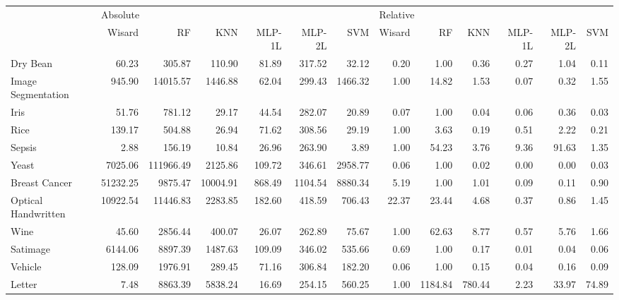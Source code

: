\begin{tabular}{lrrrrrrrrrrrr}
\toprule
{} & \multicolumn{6}{l}{Absolute} & \multicolumn{6}{l}{Relative} \\
{} &   Wisard &        RF &      KNN & MLP-1L &  MLP-2L &     SVM &   Wisard &      RF &    KNN & MLP-1L & MLP-2L &   SVM \\
\midrule
Dry Bean            &    60.23 &    305.87 &   110.90 &  81.89 &  317.52 &   32.12 &     0.20 &    1.00 &   0.36 &   0.27 &   1.04 &  0.11 \\
Image Segmentation  &   945.90 &  14015.57 &  1446.88 &  62.04 &  299.43 & 1466.32 &     1.00 &   14.82 &   1.53 &   0.07 &   0.32 &  1.55 \\
Iris                &    51.76 &    781.12 &    29.17 &  44.54 &  282.07 &   20.89 &     0.07 &    1.00 &   0.04 &   0.06 &   0.36 &  0.03 \\
Rice                &   139.17 &    504.88 &    26.94 &  71.62 &  308.56 &   29.19 &     1.00 &    3.63 &   0.19 &   0.51 &   2.22 &  0.21 \\
Sepsis              &     2.88 &    156.19 &    10.84 &  26.96 &  263.90 &    3.89 &     1.00 &   54.23 &   3.76 &   9.36 &  91.63 &  1.35 \\
Yeast               &  7025.06 & 111966.49 &  2125.86 & 109.72 &  346.61 & 2958.77 &     0.06 &    1.00 &   0.02 &   0.00 &   0.00 &  0.03 \\
Breast Cancer       & 51232.25 &   9875.47 & 10004.91 & 868.49 & 1104.54 & 8880.34 &     5.19 &    1.00 &   1.01 &   0.09 &   0.11 &  0.90 \\
Optical Handwritten & 10922.54 &  11446.83 &  2283.85 & 182.60 &  418.59 &  706.43 &    22.37 &   23.44 &   4.68 &   0.37 &   0.86 &  1.45 \\
Wine                &    45.60 &   2856.44 &   400.07 &  26.07 &  262.89 &   75.67 &     1.00 &   62.63 &   8.77 &   0.57 &   5.76 &  1.66 \\
Satimage            &  6144.06 &   8897.39 &  1487.63 & 109.09 &  346.02 &  535.66 &     0.69 &    1.00 &   0.17 &   0.01 &   0.04 &  0.06 \\
Vehicle             &   128.09 &   1976.91 &   289.45 &  71.16 &  306.84 &  182.20 &     0.06 &    1.00 &   0.15 &   0.04 &   0.16 &  0.09 \\
Letter              &     7.48 &   8863.39 &  5838.24 &  16.69 &  254.15 &  560.25 &     1.00 & 1184.84 & 780.44 &   2.23 &  33.97 & 74.89 \\

\end{tabular}

